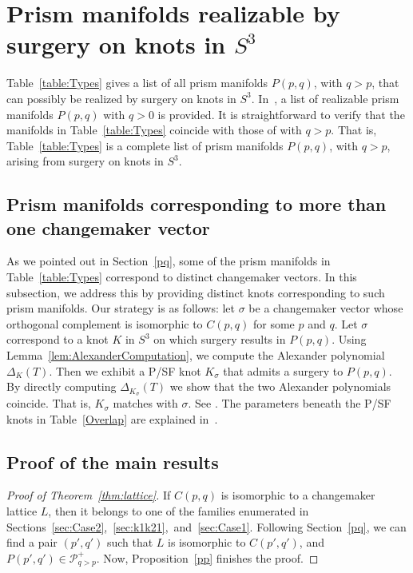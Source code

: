 \section{Prism manifolds realizable by surgery on knots in $S^3$}\label{realizable}
Table~\ref{table:Types} gives a list of all prism manifolds $P(p,q)$, with $q>p$, that can possibly be realized by surgery on knots in $S^3$. In~\cite[Table~2]{Prism2016}, a list of realizable prism manifolds $P(p,q)$ with $q>0$ is provided. It is straightforward to verify that the manifolds in Table~\ref{table:Types} coincide with those of \cite[Table~2]{Prism2016} with $q>p$. That is, Table~\ref{table:Types} is a complete list of prism manifolds $P(p,q)$, with $q>p$, arising from surgery on knots in $S^3$. 

\subsection{Prism manifolds corresponding to more than one changemaker vector}

As we pointed out in Section~\ref{pq}, some of the prism manifolds in Table~\ref{table:Types} correspond to distinct changemaker vectors. In this subsection, we address this by providing distinct knots corresponding to such prism manifolds. Our strategy is as follows: let $\sigma$ be a changemaker vector whose orthogonal complement is isomorphic to $C(p,q)$ for some $p$ and $q$. Let $\sigma$ correspond to a knot $K$ in $S^3$ on which surgery results in $P(p,q)$. Using Lemma~\ref{lem:AlexanderComputation}, we compute the Alexander polynomial $\Delta_K(T)$. Then we exhibit a P/SF knot $K_\sigma$ that admits a surgery to $P(p,q)$. By directly computing $\Delta_{K_\sigma}(T)$ we show that the two Alexander polynomials coincide. That is, $K_\sigma$ matches with $\sigma$. See \cite[Section~13.2]{Prism2016}. The parameters beneath the P/SF knots in Table~\ref{Overlap} are explained in~\cite{Prism2016}.    

\subsection{Proof of the main results}

\begin{proof}[Proof of Theorem~\ref{thm:lattice}]
If $C(p,q)$ is isomorphic to a changemaker lattice $L$, then it belongs to one of the families enumerated in Sections~\ref{sec:Case2},~\ref{sec:k1k21},~and~\ref{sec:Case1}. Following Section~\ref{pq}, we can find a pair $(p',q')$ such that $L$ is isomorphic to $C(p', q')$, and $P(p',q')\in \mathcal P^+_{q>p}$. Now, Proposition~\ref{pp} finishes the proof.
\end{proof}

